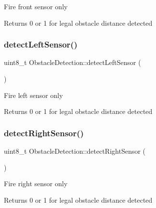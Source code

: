 Fire front sensor only \begin{DoxyReturn}{Returns}
0 or 1 for legal obstacle distance detected 
\end{DoxyReturn}
\mbox{\label{class_obstacle_detection_adbb2c4295e35c5c4c2b63aed42588bd0}} 
\subsubsection{\texorpdfstring{detect\+Left\+Sensor()}{detectLeftSensor()}}
{\footnotesize\ttfamily uint8\+\_\+t Obstacle\+Detection\+::detect\+Left\+Sensor (\begin{DoxyParamCaption}{ }\end{DoxyParamCaption})\hspace{0.3cm}{\ttfamily [private]}}

Fire left sensor only \begin{DoxyReturn}{Returns}
0 or 1 for legal obstacle distance detected 
\end{DoxyReturn}
\mbox{\label{class_obstacle_detection_a135adf6077c8af44e33e6814ad7ee9f0}} 
\subsubsection{\texorpdfstring{detect\+Right\+Sensor()}{detectRightSensor()}}
{\footnotesize\ttfamily uint8\+\_\+t Obstacle\+Detection\+::detect\+Right\+Sensor (\begin{DoxyParamCaption}{ }\end{DoxyParamCaption})\hspace{0.3cm}{\ttfamily [private]}}

Fire right sensor only \begin{DoxyReturn}{Returns}
0 or 1 for legal obstacle distance detected 
\end{DoxyReturn}
\mbox{\label{class_obstacle_detection_a4977cf4929ce5b8ec1b42353df9bd2b7}} 

